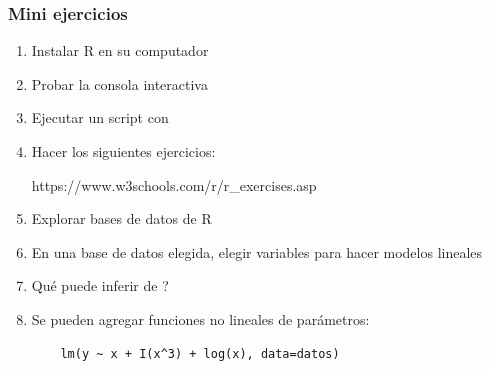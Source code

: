 \documentclass[14pt,aspectratio=169,xcolor=dvipsnames]{beamer}
\begin{document}
\begin{frame}
    \maketitle
\end{frame}
\begin{frame}[noframenumbering]\frametitle{Mini ejercicios}
    \begin{enumerate}
        \item Instalar R en su computador 
        \item Probar la consola interactiva
        \item Ejecutar un script con 
        \item Hacer los siguientes ejercicios: 
            \begin{center}
                https://www.w3schools.com/r/r\_exercises.asp
            \end{center}
        \item Explorar bases de datos de R
        \item En una base de datos elegida, elegir variables para hacer modelos lineales
        \item Qué puede inferir de ?
        \item Se pueden agregar funciones no lineales de parámetros:
            \begin{verbatim}
    lm(y ~ x + I(x^3) + log(x), data=datos)
            \end{verbatim}

    \end{enumerate}
\end{frame}
\end{document}
